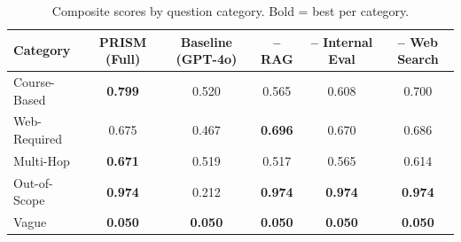 \begin{table}[htbp]
\centering
\caption{Composite scores by question category. Bold = best per category.}
\label{tab:category_composite}
\begin{tabular}{lccccc}
\toprule
Category & PRISM (Full) & Baseline (GPT-4o) & – RAG & – Internal Eval & – Web Search \\
\midrule
Course-Based & \textbf{0.799} & 0.520 & 0.565 & 0.608 & 0.700 \\
Web-Required & 0.675 & 0.467 & \textbf{0.696} & 0.670 & 0.686 \\
Multi-Hop & \textbf{0.671} & 0.519 & 0.517 & 0.565 & 0.614 \\
Out-of-Scope & \textbf{0.974} & 0.212 & \textbf{0.974} & \textbf{0.974} & \textbf{0.974} \\
Vague & \textbf{0.050} & \textbf{0.050} & \textbf{0.050} & \textbf{0.050} & \textbf{0.050} \\
\bottomrule
\end{tabular}
\end{table}
